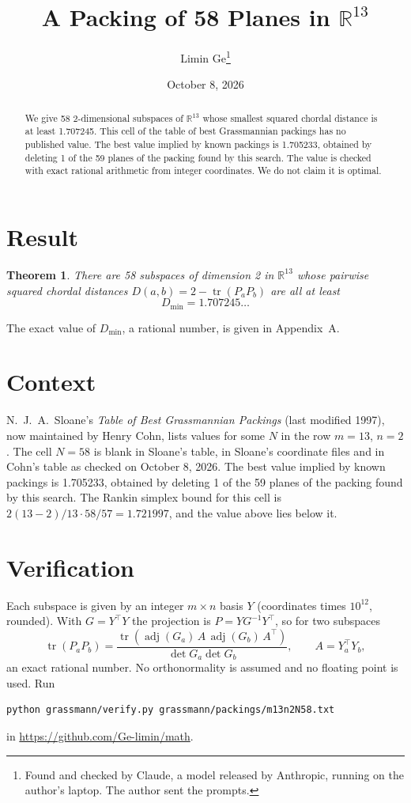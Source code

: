 \documentclass[11pt,a4paper]{article}
\title{A Packing of 58 Planes in $\mathbb{R}^{13}$}
\author{Limin Ge\thanks{Found and checked by Claude, a model released by Anthropic, running on the author's laptop. The author sent the prompts.}}
\date{October 8, 2026}
\newtheorem*{theorem}{Theorem}
\begin{document}
\maketitle
\begin{abstract}
We give 58 2-dimensional subspaces of $\mathbb{R}^{13}$ whose smallest squared chordal distance is at least 1.707245. This cell of the table of best Grassmannian packings has no published value. The best value implied by known packings is 1.705233, obtained by deleting 1 of the 59 planes of the packing found by this search. The value is checked with exact rational arithmetic from integer coordinates. We do not claim it is optimal.
\end{abstract}

\section{Result}
\begin{theorem}
There are 58 subspaces of dimension 2 in $\mathbb{R}^{13}$ whose pairwise squared chordal distances $D(a,b) = 2 - \operatorname{tr}(P_aP_b)$ are all at least
\[ D_{\min} = 1.707245\ldots \]
\end{theorem}
The exact value of $D_{\min}$, a rational number, is given in Appendix~A.


\section{Context}
N.~J.~A.~Sloane's \emph{Table of Best Grassmannian Packings} (last modified 1997), now maintained by Henry Cohn, lists values for some $N$ in the row $m=13$, $n=2$. The cell $N=58$ is blank in Sloane's table, in Sloane's coordinate files and in Cohn's table as checked on October 8, 2026. The best value implied by known packings is 1.705233, obtained by deleting 1 of the 59 planes of the packing found by this search. The Rankin simplex bound for this cell is $2(13-2)/13\cdot 58/57 = 1.721997$, and the value above lies below it.


\section{Verification}
Each subspace is given by an integer $m\times n$ basis $Y$ (coordinates times $10^{12}$, rounded). With $G=Y^\top Y$ the projection is $P=YG^{-1}Y^\top$, so for two subspaces
\[ \operatorname{tr}(P_aP_b)=\frac{\operatorname{tr}(\operatorname{adj}(G_a)\,A\,\operatorname{adj}(G_b)\,A^\top)}{\det G_a\det G_b},\qquad A=Y_a^\top Y_b, \]
an exact rational number. No orthonormality is assumed and no floating point is used. Run
\begin{verbatim}
python grassmann/verify.py grassmann/packings/m13n2N58.txt
\end{verbatim}
in \url{https://github.com/Ge-limin/math}.
\end{document}
